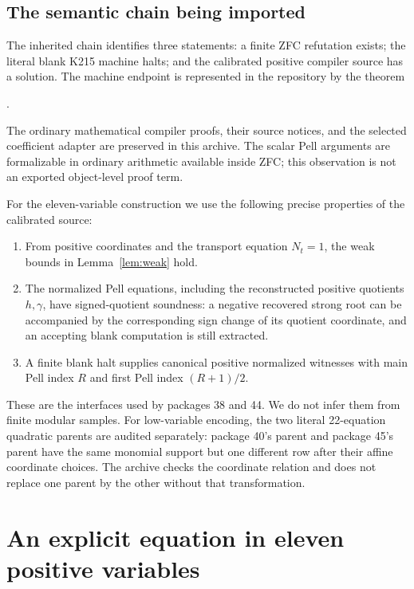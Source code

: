 \documentclass[11pt,a4paper]{article}
\theoremstyle{definition}
\theoremstyle{remark}
\numberwithin{equation}{section}
\begin{document}
\subsection{The semantic chain being imported}

The inherited chain identifies three statements: a finite ZFC refutation
exists; the literal blank K215 machine halts; and the calibrated positive
compiler source has a solution. The machine endpoint is represented in
the repository by the theorem
\begin{center}
\small\texttt{}.
\end{center}
The ordinary mathematical compiler proofs, their source notices, and
the selected coefficient adapter are preserved in this archive.
The scalar Pell arguments are formalizable in ordinary arithmetic
available inside ZFC; this observation is not an exported object-level
proof term.

For the eleven-variable construction we use the following precise
properties of the calibrated source:
\begin{enumerate}
\item From positive coordinates and the transport equation $N_t=1$,
the weak bounds in Lemma~\ref{lem:weak} hold.
\item The normalized Pell equations, including the reconstructed positive
quotients $h,\gamma$, have signed-quotient soundness: a negative recovered
strong root can be accompanied by the corresponding sign change of its
quotient coordinate, and an accepting blank computation is still extracted.
\item A finite blank halt supplies canonical positive normalized
witnesses with main Pell index $R$ and first Pell index $(R+1)/2$.
\end{enumerate}
These are the interfaces used by packages 38 and 44. We do not infer
them from finite modular samples. For low-variable encoding, the two
literal 22-equation quadratic parents are audited separately: package
40's parent and package 45's parent have the same monomial support but
one different row after their affine coordinate choices. The archive
checks the coordinate relation and does not replace one parent by the
other without that transformation.



\section{An explicit equation in eleven positive variables}
\label{sec:eleven}
\end{document}
